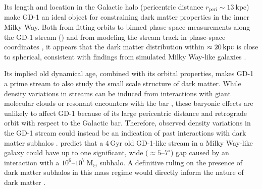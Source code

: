 \documentclass[modern]{aastex62}
\newcommand{\msun}{\textrm{M}_\odot}
\newcommand{\kpc}{\textrm{kpc}}
\begin{document}
Its length and location in the Galactic halo (pericentric distance
$r_\textrm{peri} \sim 13~\kpc$) make GD-1 an ideal object for constraining dark
matter properties in the inner Milky Way.
Both from fitting orbits to binned phase-space measurements along the GD-1
stream (\citealt{Koposov:2010}) and from modeling the stream track in
phase-space coordinates \citep{Bowden:2015, Bovy:2016}, it appears that the dark
matter distribution within $\approx20\,\rm kpc$ is close to spherical, consistent
with findings from simulated Milky Way-like galaxies \citep{Zhu:2016}.

Its implied old dynamical age, combined with its orbital properties, makes GD-1
a prime stream to also study the small scale structure of dark matter.
While density variations in streams can be induced from interactions with giant
molecular clouds \citep{Amorisco:2016} or resonant encounters with the bar
\citep{Pearson:2017}, these baryonic effects are unlikely to affect GD-1 because
of its large pericentric distance and retrograde orbit with respect to the
Galactic bar.
Therefore, observed density variations in the GD-1 stream could instead be an
indication of past interactions with dark matter subhalos
\citep[e.g.,][]{Ngan:2014}.
\citet{Erkal:2016} predict that a 4\,Gyr old GD-1-like stream in a Milky Way-like galaxy
could have up to one significant, wide
($\approx 5$--$7^\circ$) gap caused by an interaction with a
$10^6$--$10^7~\msun$ subhalo.
A definitive ruling on the presence of dark matter subhalos in this mass regime
would directly inform the nature of dark matter \citep[e.g.,][]{Bullock:2017}.
\end{document}
